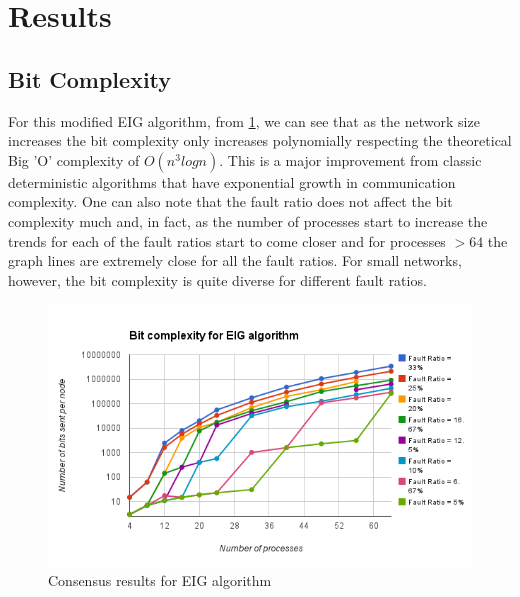 \section{Results}

\subsection{Bit Complexity}
For this modified EIG algorithm, from \ref{fig:eig}, we can see that as the network size increases the bit complexity only increases polynomially respecting the theoretical Big 'O' complexity of $O(n^3 logn)$. This is a major improvement from classic deterministic algorithms that have exponential growth in communication complexity. One can also note that the fault ratio does not affect the bit complexity much and, in fact, as the number of processes start to increase the trends for each of the fault ratios start to come closer and for processes $>64$ the graph lines are extremely close for all the fault ratios. For small networks, however, the bit complexity is quite diverse for different fault ratios.
\begin{figure}[h]
 \centering
\includegraphics[scale=0.4]{eig}
\caption{Consensus results for EIG algorithm}
 \label{fig:eig}
\end{figure}

